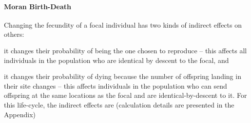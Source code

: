 \documentclass[11pt, letterpaper]{article}
\newcommand{\appname}[0]{Appendix}
\begin{document}
\paragraph{Moran Birth-Death} Changing the fecundity of a focal individual has two kinds of indirect effects on others: \begin{inparaenum}[\it i\rm )]\item it changes their probability of being the one chosen to reproduce -- this affects all individuals in the population who are identical by descent to the focal, and \item it changes their probability of dying because the number of offspring landing in their site changes -- this affects individuals in the population who can send offspring at the same locations as the focal and are identical-by-descent to it. For this life-cycle, the indirect effects are (calculation details are presented in the \appname) \end{inparaenum}
%
\end{document}
